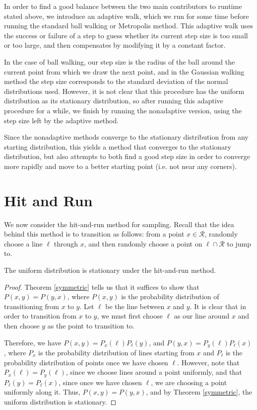 \documentclass[11pt]{article}
\begin{document}
In order to find a good balance between the two main contributors to runtime stated above, we introduce an adaptive walk, which we run for some time before running the standard ball walking or Metropolis method. This adaptive walk uses the success or failure of a step to guess whether its current step size is too small or too large, and then compensates by modifying it by a constant factor.

In the case of ball walking, our step size is the radius of the ball around the current point from which we draw the next point, and in the Gaussian walking method the step size corresponds to the standard deviation of the normal distributions used. However, it is not clear that this procedure has the uniform distribution as its stationary distribution, so after running this adaptive procedure for a while, we finish by running the nonadaptive version, using the step size left by the adaptive method.

Since the nonadaptive methods converge to the stationary distribution from any starting distribution, this yields a method that converges to the stationary distribution, but also attempts to both find a good step size in order to converge more rapidly and move to a better starting point (i.e. not near any corners).

\section{Hit and Run}

We now consider the hit-and-run method for sampling. Recall that the idea behind this method is to transition as follows: from a point $x \in \mathcal{R}$, randomly choose a line $\ell$ through $x$, and then randomly choose a point on $\ell \cap \mathcal{R}$ to jump to.

\begin{prop}
The uniform distribution is stationary under the hit-and-run method.
\end{prop}
\begin{proof}
Theorem \ref{symmetric} tells us that it suffices to show that $P(x,y) = P(y,x)$, where $P(x,y)$ is the probability distribution of transitioning from $x$ to $y$. Let $\ell$ be the line between $x$ and $y$. It is clear that in order to transition from $x$ to $y$, we must first choose $\ell$ as our line around $x$ and then choose $y$ as the point to transition to. 

Therefore, we have $P(x,y) = P_x(\ell)P_\ell(y)$, and $P(y,x) = P_y(\ell)P_\ell(x)$, where $P_x$ is the probability distribution of lines starting from $x$ and $P_\ell$ is the probability distribution of points once we have chosen $\ell$. However, note that $P_x(\ell) = P_y(\ell)$, since we choose lines around a point uniformly, and that $P_\ell(y) = P_\ell(x)$, since once we have chosen $\ell$, we are choosing a point uniformly along it. Thus, $P(x,y) = P(y,x)$, and by Theorem \ref{symmetric}, the uniform distribution is stationary.
\end{proof}
\end{document}
